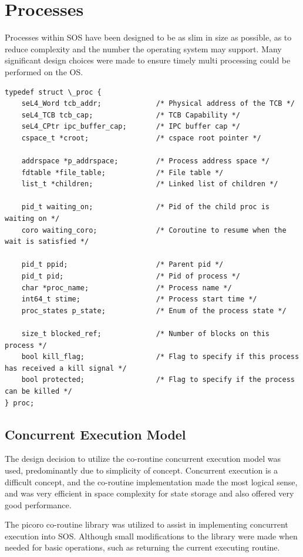 \documentclass[runningheads,a4paper]{llncs}
\begin{document}
\section{Processes}
Processes within SOS have been designed to be as slim in size as possible, as to reduce complexity and the number the operating system may support. Many significant design choices were made to ensure timely multi processing could be performed on the OS.

\begin{lstlisting}[style=CStyle]
typedef struct \_proc {
    seL4_Word tcb_addr;             /* Physical address of the TCB */
    seL4_TCB tcb_cap;               /* TCB Capability */
    seL4_CPtr ipc_buffer_cap;       /* IPC buffer cap */
    cspace_t *croot;                /* cspace root pointer */

    addrspace *p_addrspace;         /* Process address space */
    fdtable *file_table;            /* File table */
    list_t *children;               /* Linked list of children */
  
    pid_t waiting_on;               /* Pid of the child proc is waiting on */
    coro waiting_coro;              /* Coroutine to resume when the wait is satisfied */

    pid_t ppid;                     /* Parent pid */
    pid_t pid;                      /* Pid of process */
    char *proc_name;                /* Process name */
    int64_t stime;                  /* Process start time */
    proc_states p_state;            /* Enum of the process state */

    size_t blocked_ref;             /* Number of blocks on this process */
    bool kill_flag;                 /* Flag to specify if this process has received a kill signal */
    bool protected;                 /* Flag to specify if the process can be killed */
} proc;
\end{lstlisting}

\subsection{Concurrent Execution Model}
The design decision to utilize the co-routine concurrent execution model was used, predominantly due to simplicity of concept. Concurrent execution is a difficult concept, and the co-routine implementation made the most logical sense, and was very efficient in space complexity for state storage and also offered very good performance.

The picoro co-routine library was utilized to assist in implementing concurrent execution into SOS. Although small modifications to the library were made when needed for basic operations, such as returning the current executing routine.
\end{document}
